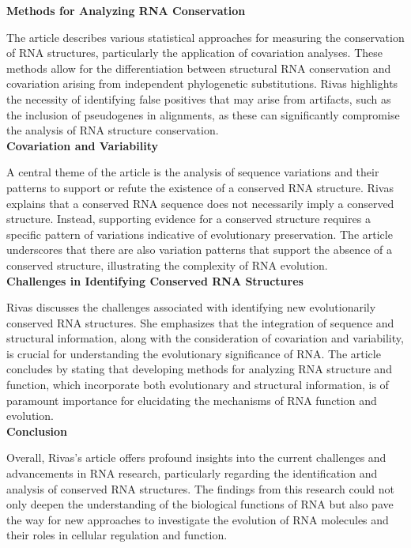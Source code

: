 \documentclass{article}
\begin{document}
\begin{large}
\begin{large}
\begin{large}
\textbf{Methods for Analyzing RNA Conservation}\par
The article describes various statistical approaches for measuring the conservation of RNA structures, particularly the application of covariation analyses. These methods allow for the differentiation between structural RNA conservation and covariation arising from independent phylogenetic substitutions. Rivas highlights the necessity of identifying false positives that may arise from artifacts, such as the inclusion of pseudogenes in alignments, as these can significantly compromise the analysis of RNA structure conservation.\\[0.5em]

\textbf{Covariation and Variability}\par
A central theme of the article is the analysis of sequence variations and their patterns to support or refute the existence of a conserved RNA structure. Rivas explains that a conserved RNA sequence does not necessarily imply a conserved structure. Instead, supporting evidence for a conserved structure requires a specific pattern of variations indicative of evolutionary preservation. The article underscores that there are also variation patterns that support the absence of a conserved structure, illustrating the complexity of RNA evolution.\\[0.5em]

\textbf{Challenges in Identifying Conserved RNA Structures}\par
Rivas discusses the challenges associated with identifying new evolutionarily conserved RNA structures. She emphasizes that the integration of sequence and structural information, along with the consideration of covariation and variability, is crucial for understanding the evolutionary significance of RNA. The article concludes by stating that developing methods for analyzing RNA structure and function, which incorporate both evolutionary and structural information, is of paramount importance for elucidating the mechanisms of RNA function and evolution.\\[0.5em]

\textbf{Conclusion}\par
Overall, Rivas's article offers profound insights into the current challenges and advancements in RNA research, particularly regarding the identification and analysis of conserved RNA structures. The findings from this research could not only deepen the understanding of the biological functions of RNA but also pave the way for new approaches to investigate the evolution of RNA molecules and their roles in cellular regulation and function.\\[0.5em]


\end{large}
\end{large}
\end{large}
\end{document}
